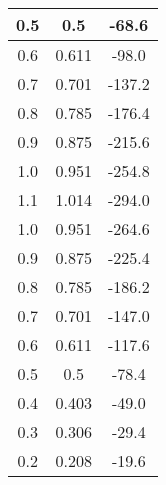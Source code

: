 \documentclass[a4paper,12pt]{article} %
\begin{document}
\begin{table}[h]
\begin{tabular}{|c|c|c|}
            0.5 & 0.5 & -68.6 \\ \hline
            0.6 & 0.611 & -98.0 \\ \hline
            0.7 & 0.701 & -137.2 \\ \hline
            0.8 & 0.785 & -176.4 \\ \hline
            0.9 & 0.875 & -215.6 \\ \hline
            1.0 & 0.951 & -254.8 \\ \hline
            1.1 & 1.014 & -294.0 \\ \hline
            1.0 & 0.951 & -264.6 \\ \hline
            0.9 & 0.875 & -225.4 \\ \hline
            0.8 & 0.785 & -186.2 \\ \hline
            0.7 & 0.701 & -147.0 \\ \hline
            0.6 & 0.611 & -117.6 \\ \hline
            0.5 & 0.5 & -78.4 \\ \hline
            0.4 & 0.403 & -49.0 \\ \hline
            0.3 & 0.306 & -29.4 \\ \hline
            0.2 & 0.208 & -19.6 \\ \hline
	\end{tabular}
    

\end{table}
\end{document}
